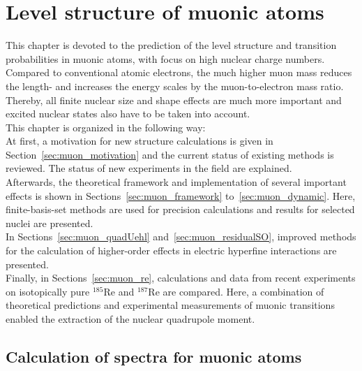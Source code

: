 \chapter{Level structure of muonic atoms}
\label{ch:muonic_atoms}
This chapter is devoted to the prediction of the level structure and transition probabilities in muonic atoms, with focus on high nuclear charge numbers. Compared to conventional atomic electrons, the much higher muon mass reduces the length- and  increases the energy scales by the muon-to-electron mass ratio. Thereby, all finite nuclear size and shape effects are much more important and excited nuclear states also have to be taken into account.\\
This chapter is organized in the following way:\\
At first, a motivation for new structure calculations is given in Section~\ref{sec:muon_motivation} and the current status of existing methods is reviewed. The status of new experiments in the field are explained.\\
Afterwards, the theoretical framework and implementation of several important effects is shown in Sections~\ref{sec:muon_framework} to~\ref{sec:muon_dynamic}. Here, finite-basis-set methods are used for precision calculations and results for selected nuclei are presented.\\
In Sections~\ref{sec:muon_quadUehl} and~\ref{sec:muon_residualSO}, improved methods for the calculation of higher-order effects in electric hyperfine interactions are presented.\\
Finally, in Sections~\ref{sec:muon_re}, calculations and data from recent experiments on isotopically pure $^{185}$Re and $^{187}$Re are compared. Here, a combination of theoretical predictions and experimental measurements of muonic transitions enabled the extraction of the nuclear quadrupole moment.

\section{Calculation of spectra for muonic atoms}
\label{sec:calculationSpectraMuon}
